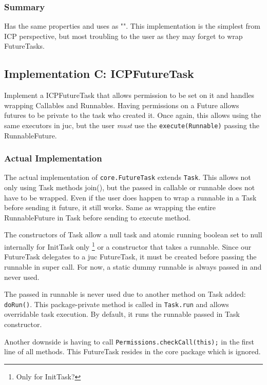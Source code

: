 \subsubsection*{Summary}
Has the same properties and uses as "". This implementation is
the simplest from ICP perspective, but most troubling to the user as they may forget to wrap FutureTasks.

\subsection{Implementation C: ICPFutureTask}
Implement a ICPFutureTask that allows permission to be set on it and handles wrapping Callables and Runnables.
Having permissions on a Future allows futures to be private to the task who created it. Once again, this allows
using the same executors in \gls{juc}, but the user \textit{must} use the \lstinline{execute(Runnable)} passing
the RunnableFuture.

\subsubsection*{Actual Implementation}
The actual implementation of \lstinline{core.FutureTask} extends \lstinline{Task}. This allows not only using Task
methods join(), but the passed in callable or runnable does not have to be wrapped. Even if the user
does happen to wrap a runnable in a Task before sending it future, it still works. Same as wrapping the entire
RunnableFuture in Task before sending to execute method.

The constructors of Task allow a null task and atomic running boolean set to null internally for InitTask only
\footnote{Only for InitTask?}
or a constructor that takes a runnable. Since our FutureTask delegates to a \gls{juc} FutureTask, it must be created
before passing the runnable in super call. For now, a static dummy runnable is always
passed in and never used.

The passed in runnable is never used due to another method on Task added: \lstinline{doRun()}. This package-private method
is called in \lstinline{Task.run} and allows overridable task execution. By default, it runs the runnable passed in
Task constructor.

Another downside is having to call \lstinline{Permissions.checkCall(this);} in the first line of all methods. This
FutureTask resides in the core package which is ignored.

